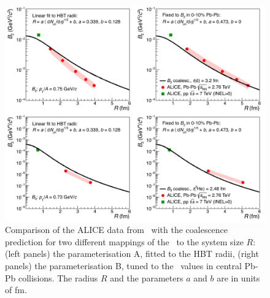 \begin{figure}[htbp]
	\begin{center}
		\includegraphics[width=\textwidth]{../radiiParamCompareData.png}
		\caption{Comparison of the ALICE data from~\cite{ALICE:nucleipp2017, ALICE:deuteronppPbPb2015} with the coalescence prediction for two different mappings of the \avdNdeta~to the system size $R$: (left panels) the parameterisation A, fitted to the HBT radii, (right panels) the parameterisation B, tuned to the \btwo~values in central Pb-Pb collisions. The radius $R$ and the parameters $a$ and $b$ are in units of fm.}
		\label{fig:CompareB2B3forDifferentParamWithData}
	\end{center}
\end{figure}

